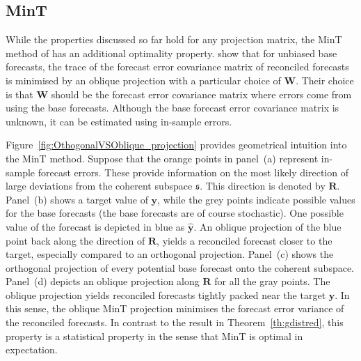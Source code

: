 \documentclass[12pt]{article}
\theoremstyle{definition}
\begin{document}
\subsection{MinT}

While the properties discussed so far hold for any projection matrix, the MinT method of \citet{WicEtAl2019} has an additional optimality property. \citet{WicEtAl2019} show that for unbiased base forecasts, the trace of the forecast error covariance matrix of reconciled forecasts is minimised by an oblique projection with a particular choice of $\bm{W}$. Their choice is that $\bm{W}$ should be the forecast error covariance matrix where errors come from using the base forecasts. Although the base forecast error covariance matrix is unknown, it can be estimated using in-sample errors.

Figure~\ref{fig:OthogonalVSOblique_projection} provides geometrical intuition into the MinT method. Suppose that the orange points in panel~(a) represent in-sample forecast errors. These provide information on the most likely direction of large deviations from the coherent subspace $\mathfrak{s}$. This direction is denoted by $\bm{R}$. Panel~(b) shows a target value of $\bm{y}$, while the grey points indicate possible values for the base forecasts (the base forecasts are of course stochastic). One possible value of the forecast is depicted in blue as $\hat{\bm{y}}$. An oblique projection of the blue point back along the direction of $\bm{R}$, yields a reconciled forecast closer to the target, especially compared to an orthogonal projection. Panel~(c) shows the orthogonal projection of every potential base forecast onto the coherent subspace. Panel~(d) depicts an oblique projection along $\bm{R}$ for all the gray points. The oblique projection yields reconciled forecasts tightly packed near the target $\bm{y}$. In this sense, the oblique MinT projection minimises the forecast error variance of the reconciled forecasts. In contrast to the result in Theorem~\ref{th:gdistred}, this property is a statistical property in the sense that MinT is optimal in expectation.
\end{document}
